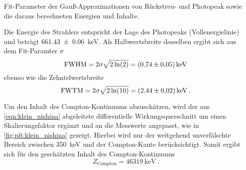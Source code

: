\begin{table}
    \centering
    \caption{
        Fit-Parameter der Gauß-Approximationen von Rückstreu- und Photopeak
        sowie die daraus berechneten Energien und Inhalte.
    }
    \label{tab:3_Cs_137}
\end{table}

Die Energie des Strahlers entspricht der Lage des Photopeaks (Vollenergielinie)
und beträgt \SI{661.43 \pm 0.06}{\kilo\electronvolt}.
Als Halbwertsbreite desselben ergibt sich aus dem Fit-Paramter $\sigma$
\begin{equation*}
    \text{FWHM} = 2 \sigma \sqrt{2 \ln(2)}
    = \SI{0.74 \pm 0.05}{\kilo\electronvolt}
\end{equation*}
ebenso wie die Zehntelwertsbreite
\begin{equation*}
    \text{FWTM} = 2 \sigma \sqrt{2 \ln(10)}
    = \SI{2.44 \pm 0.02}{\kilo\electronvolt} \, .
\end{equation*}



Um den Inhalt des Compton-Kontinuums abzuschätzen,
wird der aus \autoref{eqn:klein_nishina} abgeleitete differentielle Wirkungsquerschnitt
um einen Skalierungsfaktor ergänzt und
an die Messwerte angepasst,
    wie in \autoref{fig:plt:klein_nishina} gezeigt.
Hierbei wird nur der weitgehend unverfälschte Bereich zwischen \SI{350}{\kilo\electronvolt} und der Compton-Kante berücksichtigt.
Somit ergibt sich für den geschätzten Inhalt des Compton-Kontinuums
\begin{equation*}
    Z_\text{Compton} = \SI{46319}{\kilo\electronvolt} \, .
\end{equation*}



